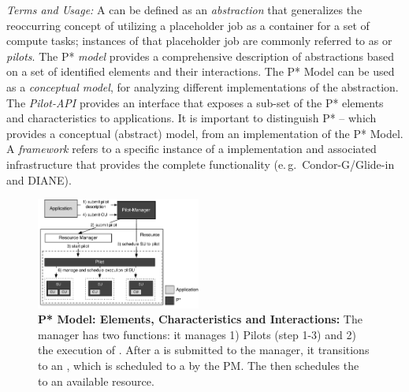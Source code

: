 \documentclass[conference]{IEEEtran}
\begin{document}
\emph{Terms and Usage:} A \pilotjob can be defined as an \emph{
  abstraction} that generalizes the reoccurring concept of utilizing a
placeholder job as a container for a set of compute tasks; instances
of that placeholder job are commonly referred to as \emph{\pilotjobs}
or \emph{pilots}. The P* \emph{model} provides a %
comprehensive description of \pilotjob abstractions based on a set of
identified elements and their interactions. The P* Model can be used
as a {\it conceptual model}, for analyzing different implementations
of the \pilotjob abstraction. The \emph{Pilot-API} provides an
interface that exposes a sub-set of the P* elements and
characteristics to applications.  It is important to distinguish P* --
which provides a conceptual (abstract) model, from an implementation
of the P* Model. A \emph{\pilotjob framework} refers to a specific
instance of a \pilotjob implementation and associated infrastructure
that provides the complete \pilotjob functionality (e.\,g.\
Condor-G/Glide-in and DIANE).



\begin{figure}[t]
    \centering
    \includegraphics[width=0.48\textwidth]{../figures/pstar_model_single.pdf}
    \caption{ \textbf{P* Model: Elements, Characteristics and
        Interactions:} The manager has two functions: it manages 1)
      Pilots (step 1-3) and 2) the execution of \cus. After a \cu is
      submitted to the manager, it transitions to an \su, which is
      scheduled to a \pilot by the PM. The \pilot then schedules the
      \su to an available resource.  }
    \label{fig:figures_pstar}
\end{figure}
\end{document}
